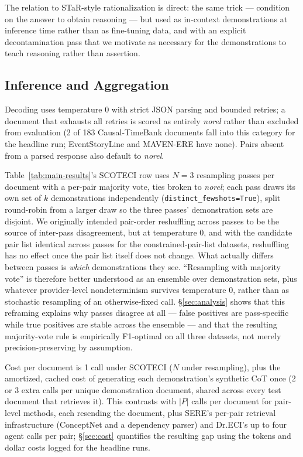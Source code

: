 \documentclass[11pt]{article}
\newcommand{\method}{SCOTECI}
\begin{document}
The relation to STaR-style rationalization \citep{zelikman2022star} is direct: the
same trick --- condition on the answer to obtain reasoning --- but used as
in-context demonstrations at inference time rather than as fine-tuning data, and
with an explicit decontamination pass that we motivate as necessary for the
demonstrations to teach reasoning rather than assertion.

\subsection{Inference and Aggregation}
\label{sec:inference}
Decoding uses temperature 0 with strict JSON parsing and bounded retries; a
document that exhausts all retries is scored as entirely \textit{norel} rather than
excluded from evaluation (2 of 183 Causal-TimeBank documents fall into this
category for the headline run; EventStoryLine and MAVEN-ERE have none). Pairs
absent from a parsed response also default to \textit{norel}.

Table~\ref{tab:main-results}'s \method{} row uses $N=3$ resampling passes per
document with a per-pair majority vote, ties broken to \textit{norel}; each pass
draws its own set of $k$ demonstrations independently
(\texttt{distinct\_fewshots=True}), split round-robin from a larger draw so the
three passes' demonstration sets are disjoint. We originally intended pair-order
reshuffling across passes to be the source of inter-pass disagreement, but at
temperature 0, and with the candidate pair list identical across passes for the
constrained-pair-list datasets, reshuffling has no effect once the pair list itself
does not change. What actually differs between passes is \emph{which}
demonstrations they see. ``Resampling with majority vote'' is therefore better
understood as an ensemble over demonstration sets, plus whatever provider-level
nondeterminism survives temperature 0, rather than as stochastic resampling of an
otherwise-fixed call. \S\ref{sec:analysis} shows that this reframing explains why
passes disagree at all --- false positives are pass-specific while true positives
are stable across the ensemble --- and that the resulting majority-vote rule is
empirically F1-optimal on all three datasets, not merely precision-preserving by
assumption.

Cost per document is 1 call under \method{} ($N$ under resampling), plus the
amortized, cached cost of generating each demonstration's synthetic CoT once (2 or
3 extra calls per unique demonstration document, shared across every test document
that retrieves it). This contrasts with $|P|$ calls per document for pair-level
methods, each resending the document, plus SERE's per-pair retrieval
infrastructure (ConceptNet and a dependency parser) and Dr.ECI's up to four agent
calls per pair; \S\ref{sec:cost} quantifies the resulting gap using the tokens and
dollar costs logged for the headline runs.
\end{document}
